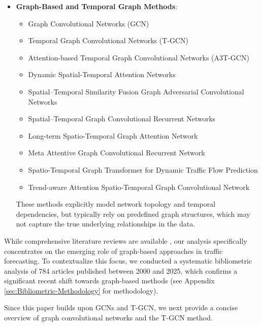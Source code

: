 \documentclass[pdflatex,sn-mathphys-num]{sn-jnl}%
\theoremstyle{thmstyleone}%
\theoremstyle{thmstyletwo}%
\theoremstyle{thmstylethree}%
\begin{document}
\begin{itemize}
\item \textbf{Graph-Based and Temporal Graph Methods}:
  \begin{itemize}
  \item Graph Convolutional Networks (GCN) \citep{kipf2017semi, Zuo2023}
  \item Temporal Graph Convolutional Networks (T-GCN) \citep{zhao2019t}
  \item Attention-based Temporal Graph Convolutional Networks (A3T-GCN) \citep{A3T-GCN}
  \item Dynamic Spatial-Temporal Attention Networks \citep{Sun2023Attention}
  \item Spatial–Temporal Similarity Fusion Graph Adversarial Convolutional Networks \citep{WANG2024107299}  
  \item Spatial–Temporal Graph Convolutional Recurrent Networks \citep{XIA2024122381}  
  \item Long-term Spatio-Temporal Graph Attention Network \citep{REMMOUCHE2025128244}
  \item Meta Attentive Graph Convolutional Recurrent Network \citep{ZEB2025128073}
  \item Spatio-Temporal Graph Transformer for Dynamic Traffic Flow Prediction \citep{Jia2025}
  \item Trend-aware Attention Spatio-Temporal Graph Convolutional Network \citep{Chen2026TASTGCN}
  \end{itemize} 
  These methods explicitly model network topology and temporal dependencies, but typically rely on predefined graph structures, which may not capture the true underlying relationships in the data.
\end{itemize}

While comprehensive literature reviews are available \citep{REMMOUCHE2025128244, Liu2025review, Peng2024Overview}, our analysis specifically concentrates on the emerging role of graph-based approaches in traffic forecasting. To contextualize this focus, we conducted a systematic bibliometric analysis of 784 articles published between 2000 and 2025, which confirms a significant recent shift towards graph-based methods (see Appendix \ref{sec:Bibliometric-Methodology} for methodology). 

Since this paper builds upon GCNs and T-GCN, we next provide a concise overview of graph convolutional networks and the T-GCN method.
\end{document}
